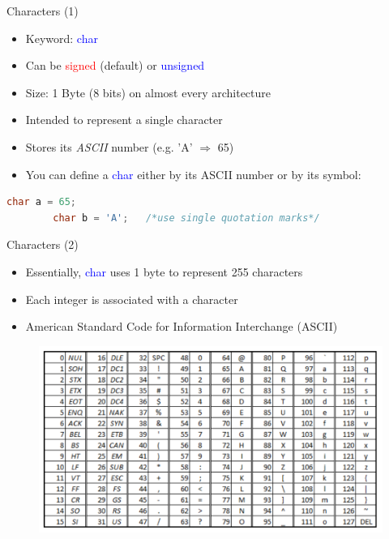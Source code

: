\begin{frame}[fragile]{Characters (1)}
	\begin{itemize}
		\item Keyword: \textcolor{blue}{char}
		\item Can be \textcolor{red}{signed} (default) or \textcolor{blue}{unsigned}	
		\item Size: 1 Byte (8 bits) on almost every architecture
		\item Intended to represent a single character
		\item Stores its \textit{ASCII} number (e.g. 'A' $\Rightarrow$ 65)
	\end{itemize}
	\begin{itemize}
		\item {	You can define a \textcolor{blue}{char} either by its ASCII number or by its symbol:}	
	\end{itemize}
	\begin{lstlisting}[numbers=none, language=c]
		char a = 65;
		char b = 'A';	/*use single quotation marks*/
\end{lstlisting}
\end{frame}

\begin{frame}[fragile]{Characters (2)}
	\begin{itemize}
		\item {Essentially, \textcolor{blue}{char} uses 1 byte to represent 255 characters}
		\item {Each integer is associated with a character}
		\item {American Standard Code for Information Interchange (ASCII)}
	\end{itemize}
	\vspace{-0.06in}
	\begin{figure}
		\centering
		\includegraphics[width=0.8\linewidth]{figs/ascii.pdf}
	\end{figure}
\end{frame}


